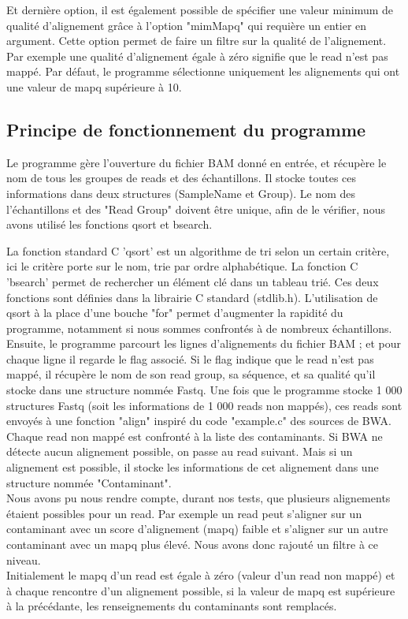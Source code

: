 \documentclass[a4paper,12pt]{article}
\begin{document}
Et dernière option, il est également possible de spécifier une valeur minimum de qualité d'alignement grâce à l'option "mimMapq" qui requière un entier en argument. Cette option permet de faire un filtre sur la qualité de l'alignement. Par exemple une qualité d'alignement égale à zéro signifie que le read n'est pas mappé. Par défaut, le programme sélectionne uniquement les alignements qui ont une valeur de mapq supérieure à 10. 


\subsection{Principe de fonctionnement du programme}


Le programme gère l'ouverture du fichier BAM donné en entrée, et récupère le nom de tous les groupes de reads et des échantillons. Il stocke toutes ces informations dans deux structures (SampleName et Group). Le nom des l'échantillons et des "Read Group" doivent être unique, afin de le vérifier, nous avons utilisé les fonctions qsort et bsearch. 

La fonction standard C 'qsort' est un algorithme de tri selon un certain critère, ici le critère porte sur le nom, trie par ordre alphabétique. La fonction  C 'bsearch' permet de rechercher un élément clé dans un tableau trié. Ces deux fonctions sont définies dans la librairie C standard (stdlib.h). L'utilisation de qsort à la place d'une bouche "for" permet d'augmenter la rapidité du programme, notamment si nous sommes confrontés à de nombreux échantillons.\\


Ensuite, le programme parcourt les lignes d'alignements du fichier BAM ; et pour chaque ligne il regarde le flag associé. Si le flag indique que le read n'est pas mappé, il récupère le nom de son read group, sa séquence, et sa qualité qu'il stocke dans une structure nommée Fastq. Une fois que le programme stocke 1 000 structures Fastq (soit les informations de 1 000 reads non mappés), ces reads sont envoyés à une fonction "align" inspiré du code "example.c" des sources de BWA. \\
Chaque read non mappé est confronté à la liste des contaminants. Si BWA ne détecte aucun alignement possible, on passe au read suivant. Mais si un alignement est possible, il stocke les informations de cet alignement dans une structure nommée "Contaminant". \\ 

Nous avons pu nous rendre compte, durant nos tests, que plusieurs alignements étaient possibles pour un read. Par exemple un read peut s'aligner sur un contaminant avec un score d'alignement (mapq) faible et s'aligner sur un autre contaminant avec un mapq plus élevé. Nous avons donc rajouté un filtre à ce niveau. \\
Initialement le mapq d'un read est égale à zéro (valeur d'un read non mappé) et à chaque rencontre d'un alignement possible, si la valeur de mapq est supérieure à la précédante, les renseignements du contaminants sont remplacés. \\
\end{document}
